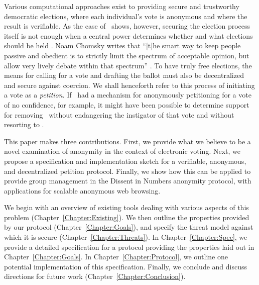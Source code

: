 Various computational approaches exist to providing secure and trustworthy
democratic elections, where each individual's vote is anonymous and where the
result is verifiable. As the case of \Tyrant~shows, however, securing the
election process itself is not enough when a central power determines whether
and what elections should be held .
Noam Chomsky writes that
``[t]he smart way to keep people passive and obedient is to strictly limit the
spectrum of acceptable opinion, but allow very lively debate within that
spectrum'' \cite{chomsky1998common}. To have truly free elections, the means for
calling for a vote and drafting the ballot must also be decentralized and secure
against coercion. We shall henceforth refer to this process of initiating a vote
as a \emph{petition}. If \Congress~had a mechanism for anonymously petitioning
for a vote of no confidence, for example, it might have been possible to
determine support for removing \Tyrant~without endangering the instigator of
that vote and without resorting to \War.
%

This paper makes three contributions. First, we provide what we believe to be
a novel examination of anonymity in the context of electronic voting. Next, we
propose a specification and implementation sketch for a verifiable, anonymous,
and decentralized petition protocol. Finally, we show how this can be applied to
provide group management in the Dissent in Numbers\cite{din} anonymity protocol,
with applications for scalable anonymous web browsing.

We begin with an overview of existing tools dealing with various aspects of this
problem (Chapter~\ref{Chapter:Existing}).  We then outline the properties
provided by our protocol (Chapter~\ref{Chapter:Goals}), and specify the threat
model against which it is secure (Chapter~\ref{Chapter:Threats}).  In
Chapter~\ref{Chapter:Spec}, we provide a detailed specification for a protocol
providing the properties laid out in Chapter~\ref{Chapter:Goals}. In
Chapter~\ref{Chapter:Protocol}, we outline one potential implementation of this
specification. Finally, we conclude and discuss
directions for future work (Chapter~\ref{Chapter:Conclusion}).

